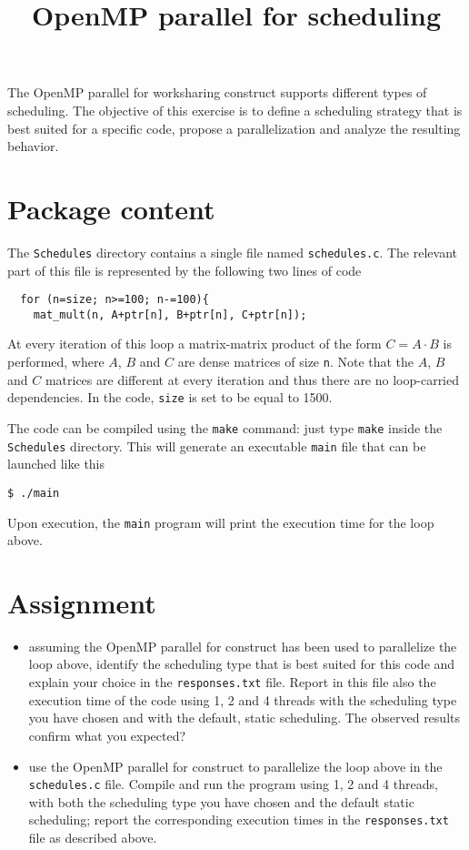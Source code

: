 \documentclass{article}
\title{OpenMP parallel for scheduling}
\date{}
\begin{document}
\maketitle

The OpenMP parallel for worksharing construct supports different types
of scheduling. The objective of this exercise is to define a
scheduling strategy that is best suited for a specific code, propose a
parallelization and analyze the resulting behavior.

\section{Package content}
The \texttt{Schedules} directory contains a single file named
\texttt{schedules.c}. The relevant part of this file is represented by
the following two lines of code
\begin{verbatim}
  for (n=size; n>=100; n-=100){
    mat_mult(n, A+ptr[n], B+ptr[n], C+ptr[n]);
\end{verbatim}
At every iteration of this loop a matrix-matrix product of the form
$C=A\cdot B$ is performed, where $A$, $B$ and $C$ are dense matrices
of size \texttt{n}. Note that the $A$, $B$ and $C$ matrices are
different at every iteration and thus there are no loop-carried
dependencies. In the code, \texttt{size} is set to be equal to 1500.

The code can be compiled using the \texttt{make} command: just type
\texttt{make} inside the \texttt{Schedules} directory. This will
generate an executable \texttt{main} file that can be launched like
this
\begin{verbatim}
$ ./main
\end{verbatim}
Upon execution, the \texttt{main} program will print the execution
time for the loop above.

\section{Assignment}

\begin{itemize}
\item \smallpencil assuming the OpenMP parallel for construct has been
  used to parallelize the loop above, identify the scheduling type
  that is best suited for this code and explain your choice in the
  \texttt{responses.txt} file. Report in this file also the execution
  time of the code using 1, 2 and 4 threads with the scheduling type you
  have chosen and with the default, static scheduling. The observed
  results confirm what you expected?
\item {\huge \Keyboard} use the OpenMP parallel for construct to
  parallelize the loop above in the \texttt{schedules.c} file. Compile
  and run the program using 1, 2 and 4 threads, with both the scheduling
  type you have chosen and the default static scheduling; report the
  corresponding execution times in the \texttt{responses.txt} file as
  described above.
\end{itemize}
\end{document}
